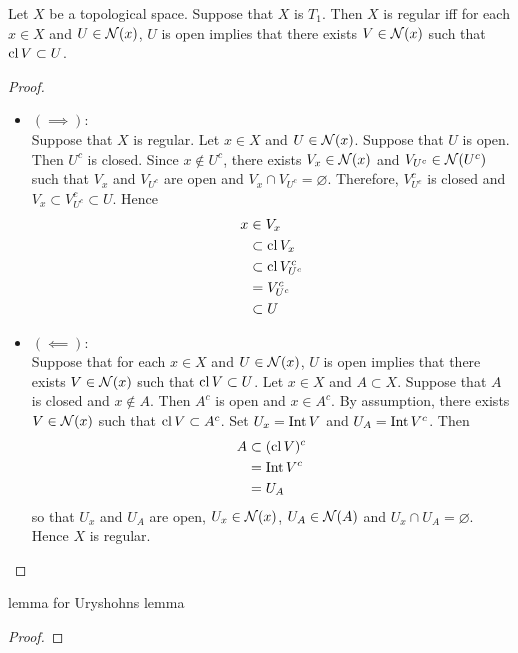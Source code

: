 \documentclass{book}
\begin{document}
	\begin{ex}
		Let $X$ be a topological space. Suppose that $X$ is $T_1$. Then $X$ is regular iff for each $x \in X$ and $U \in \mathcal{N}(x)$, $U$ is open implies that there exists $V \in \mathcal{N}(x)$ such that $\operatorname{cl} V \subset U$. 
	\end{ex}

	\begin{proof}\
		\begin{itemize}
			\item $(\implies)$: \\
			Suppose that $X$ is regular. Let $x \in X$ and $U \in \mathcal{N}(x)$. Suppose that $U$ is open. Then $U^c$ is closed. Since $x \not \in U^c$, there exists $V_x \in \mathcal{N}(x)$ and $V_{U^c} \in \mathcal{N}(U^c)$ such that $V_x$ and $V_{U^c}$ are open and $V_x \cap V_{U^c} = \varnothing$. Therefore, $V_{U^c}^c$ is closed and $V_x \subset V_{U^c}^c \subset U$. Hence
			\begin{align*}
				x 
				& \in V_x \\
				& \subset \operatorname{cl} V_x \\
				& \subset \operatorname{cl} V_{U^c}^c \\
				& = V_{U^c}^c \\
				& \subset U
			\end{align*} 
			\item $(\impliedby)$: \\
			Suppose that for each $x \in X$ and $U \in \mathcal{N}(x)$, $U$ is open implies that there exists $V \in \mathcal{N}(x)$ such that $\operatorname{cl} V \subset U$. Let $x \in X$ and $A \subset X$. Suppose that $A$ is closed and $x \not \in A$. Then $A^c$ is open and $x \in A^c$. By assumption, there exists $V \in \mathcal{N}(x)$ such that $\operatorname{cl} V \subset A^c$. Set $U_x = \operatorname{Int} V$ and $U_A = \operatorname{Int} V^c$. Then 
			\begin{align*}
				A 
				& \subset (\operatorname{cl} V)^c \\
				& = \operatorname{Int} V^c \\
				& = U_A
			\end{align*} 
			so that $U_x$ and $U_A$ are open, $U_x \in \mathcal{N}(x)$, $U_A \in \mathcal{N}(A)$ and $U_x \cap U_A = \varnothing$. Hence $X$ is regular.
		\end{itemize}
	\end{proof}

	\begin{ex}
		lemma for Uryshohns lemma
	\end{ex}

	\begin{proof}
	\end{proof}
\end{document}
